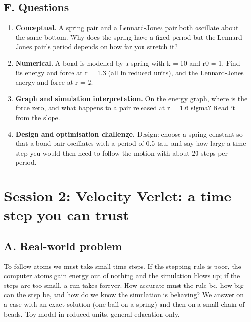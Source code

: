 \documentclass[11pt,a4paper]{article}
\begin{document}
\subsection*{F. Questions}
\begin{enumerate}[nosep]
\item \textbf{Conceptual.} A spring pair and a Lennard-Jones pair both oscillate about the same bottom. Why does the spring have a fixed period but the Lennard-Jones pair's period depends on how far you stretch it?
\item \textbf{Numerical.} A bond is modelled by a spring with k = 10 and r0 = 1. Find its energy and force at r = 1.3 (all in reduced units), and the Lennard-Jones energy and force at r = 2.
\item \textbf{Graph and simulation interpretation.} On the energy graph, where is the force zero, and what happens to a pair released at r = 1.6 sigma? Read it from the slope.
\item \textbf{Design and optimisation challenge.} Design: choose a spring constant so that a bond pair oscillates with a period of 0.5 tau, and say how large a time step you would then need to follow the motion with about 20 steps per period.
\end{enumerate}

\section{Session 2: Velocity Verlet: a time step you can trust}

\subsection*{A. Real-world problem}
To follow atoms we must take small time steps. If the stepping rule is poor, the computer atoms gain energy out of nothing and the simulation blows up; if the steps are too small, a run takes forever. How accurate must the rule be, how big can the step be, and how do we know the simulation is behaving? We answer on a case with an exact solution (one ball on a spring) and then on a small chain of beads. Toy model in reduced units, general education only.
\end{document}
